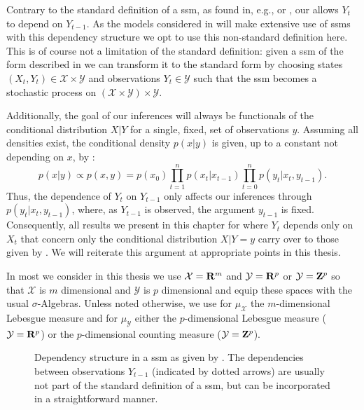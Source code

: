 \begin{remark}
    \label{rem:dependence_Yt-1}
    Contrary to the standard definition of a \gls{ssm}, as found in, e.g., \citep[Chapter 2]{Chopin2020Introduction} or \citep[Chapter 9]{Durbin2012Time}, our  allows $Y_t$ to depend on $Y_{t - 1}$.
    As the models considered in  will make extensive use of \glspl{ssm} with this dependency structure we opt to use this non-standard definition here.
    This is of course not a limitation of the standard definition: given a \gls{ssm} of the form described in  we can transform it to the standard form by choosing states $(X_t, Y_t) \in \mathcal X \times \mathcal Y$ and observations $Y_t \in \mathcal Y$ such that the \gls{ssm} becomes a stochastic process on $ \left( \mathcal X \times \mathcal Y\right) \times \mathcal Y$.

    Additionally, the goal of our inferences will always be functionals of the conditional distribution $X|Y$ for a single, fixed, set of observations $y$. Assuming all densities exist, the conditional density $p(x|y)$ is given, up to a constant not depending on $x$, by :
    $$
    p(x|y) \propto p(x,y) =p (x_0)\prod_{t = 1}^{n} p(x_{t}|x_{t - 1}) \prod_{t = 0}^{n} p(y_t | x_t, y_{t - 1}).
    $$
    Thus, the dependence of $Y_{t}$ on $Y_{t - 1}$ only affects our inferences through $p(y_{t} | x_{t}, y_{t - 1})$, where, as $Y_{t - 1}$ is observed, the argument $y_{t - 1}$ is fixed. 
    Consequently, all results we present in this chapter for  where $Y_{t}$ depends only on $X_{t}$ that concern only the conditional distribution $X|Y=y$ carry over to those given by . We will reiterate this argument at appropriate points in this thesis.

    In most  we consider in this thesis we use $\mathcal X = \mathbf R^m$ and $\mathcal Y = \mathbf R^p$ or $\mathcal Y = \mathbf Z^p$ so that $\mathcal X$ is $m$ dimensional and $\mathcal Y$ is $p$ dimensional and equip these spaces with the usual $\sigma$-Algebras. Unless noted otherwise, we use for $\mu_{\mathcal X}$ the $m$-dimensional Lebesgue measure and for $\mu_{\mathcal Y}$ either the $p$-dimensional Lebesgue measure ($\mathcal Y = \mathbf R^{p}$) or the $p$-dimensional counting measure ($\mathcal Y = \mathbf Z^{p}$).
\end{remark}

\begin{figure}
    \centering
    \caption{Dependency structure in a \acrshort{ssm} as given by . The dependencies between observations $Y_{t-1}$ (indicated by dotted arrows) are usually not part of the standard definition of a \acrshort{ssm}, but can be incorporated in a straightforward manner.}
    \label{fig:ssm_dependencies}
\end{figure}


